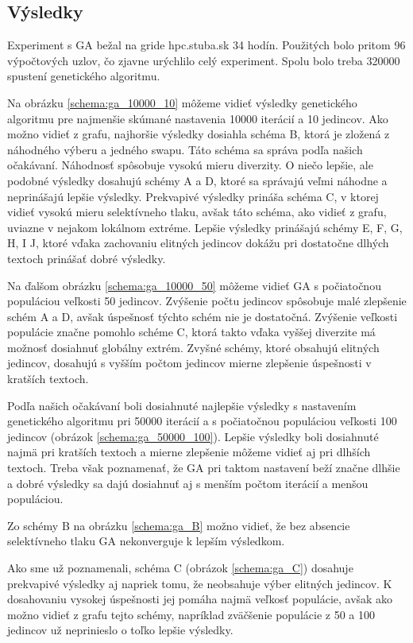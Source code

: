 \subsection{Výsledky}
Experiment s GA bežal na gride hpc.stuba.sk 34 hodín.
Použitých bolo pritom 96 výpočtových uzlov, čo zjavne urýchlilo celý experiment.
Spolu bolo treba 320000 spustení genetického algoritmu.

Na obrázku \ref{schema:ga_10000_10} môžeme vidieť výsledky genetického algoritmu pre najmenšie skúmané nastavenia 10000 iterácií a 10 jedincov.
Ako možno vidieť z grafu, najhoršie výsledky dosiahla schéma B, ktorá je zložená z náhodného výberu a jedného swapu. Táto schéma sa správa podľa našich očakávaní. Náhodnosť spôsobuje vysokú mieru diverzity.
O niečo lepšie, ale podobné výsledky dosahujú schémy A a D, ktoré sa správajú veľmi náhodne a neprinášajú lepšie výsledky.
Prekvapivé výsledky prináša schéma C, v ktorej vidieť vysokú mieru selektívneho tlaku, avšak táto schéma, ako vidieť z grafu, uviazne v nejakom lokálnom extréme.
Lepšie výsledky prinášajú schémy E, F, G, H, I J, ktoré vďaka zachovaniu elitných jedincov dokážu pri dostatočne dlhých textoch prinášať dobré výsledky.


Na ďalšom obrázku \ref{schema:ga_10000_50} môžeme vidieť GA s počiatočnou populáciou veľkosti 50 jedincov. Zvýšenie počtu jedincov spôsobuje malé zlepšenie  schém A a D, avšak úspešnosť týchto schém nie je dostatočná. Zvýšenie veľkosti populácie značne pomohlo schéme C, ktorá takto vďaka vyššej diverzite má možnosť dosiahnuť globálny extrém. Zvyšné schémy, ktoré obsahujú elitných jedincov, dosahujú s vyšším počtom jedincov mierne zlepšenie úspešnosti v kratších textoch.


Podľa našich očakávaní boli dosiahnuté najlepšie výsledky s nastavením genetického algoritmu pri 50000 iterácií a s počiatočnou populáciou veľkosti 100 jedincov (obrázok \ref{schema:ga_50000_100}). Lepšie výsledky boli dosiahnuté najmä pri kratších textoch a mierne zlepšenie môžeme vidieť aj pri dlhších textoch. Treba však poznamenať, že GA pri taktom nastavení beží značne dlhšie a dobré výsledky sa dajú dosiahnuť aj s menším počtom iterácií a menšou populáciou. 


Zo schémy B na obrázku \ref{schema:ga_B} možno vidieť, že bez absencie selektívneho tlaku GA nekonverguje k lepším výsledkom.


Ako sme už poznamenali, schéma C (obrázok \ref{schema:ga_C}) dosahuje prekvapivé výsledky aj napriek tomu, že neobsahuje výber elitných jedincov. K dosahovaniu vysokej úspešnosti jej pomáha najmä veľkosť populácie, avšak ako možno vidieť z grafu tejto schémy, napríklad zväčšenie populácie z 50 a 100 jedincov už neprinieslo o toľko lepšie výsledky.


